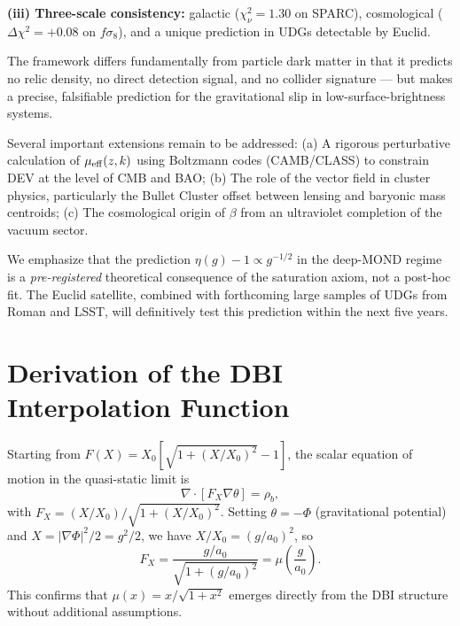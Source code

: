 \documentclass[aps,prd,twocolumn,showpacs,superscriptaddress]{revtex4-2}
\newcommand{\aO}{a_0}
\newcommand{\Xzero}{X_0}
\newcommand{\mueff}{\mu_{\rm eff}}
\begin{document}
\textbf{(iii) Three-scale consistency:}
galactic ($\chi^2_\nu = 1.30$ on SPARC),
cosmological ($\Delta\chi^2 = +0.08$ on $f\sigma_8$),
and a unique prediction in UDGs detectable by Euclid.

The framework differs fundamentally from particle dark matter
in that it predicts no relic density, no direct detection signal,
and no collider signature — but makes a precise, falsifiable
prediction for the gravitational slip in low-surface-brightness systems.

Several important extensions remain to be addressed:
(a) A rigorous perturbative calculation of $\mueff(z,k)$
    using Boltzmann codes (CAMB/CLASS) to constrain DEV at the
    level of CMB and BAO;
(b) The role of the vector field in cluster physics,
    particularly the Bullet Cluster offset between lensing
    and baryonic mass centroids;
(c) The cosmological origin of $\beta$ from an ultraviolet
    completion of the vacuum sector.

We emphasize that the prediction $\eta(g) - 1 \propto g^{-1/2}$
in the deep-MOND regime is a \emph{pre-registered} theoretical
consequence of the saturation axiom, not a post-hoc fit.
The Euclid satellite, combined with forthcoming large samples of
UDGs from Roman and LSST, will definitively test this prediction
within the next five years.

\begin{acknowledgments}
\end{acknowledgments}

\appendix

\section{Derivation of the DBI Interpolation Function}
\label{app:DBI}

Starting from $F(X) = \Xzero[\sqrt{1+(X/\Xzero)^2}-1]$,
the scalar equation of motion in the quasi-static limit is
\begin{equation}
  \nabla\cdot[F_X\nabla\theta] = \rho_b,
\end{equation}
with $F_X = (X/\Xzero)/\sqrt{1+(X/\Xzero)^2}$.
Setting $\theta = -\Phi$ (gravitational potential) and
$X = |\nabla\Phi|^2/2 = g^2/2$, we have $X/\Xzero = (g/\aO)^2$, so
\begin{equation}
  F_X = \frac{g/\aO}{\sqrt{1+(g/\aO)^2}} = \mu\!\left(\frac{g}{\aO}\right).
\end{equation}
This confirms that $\mu(x) = x/\sqrt{1+x^2}$ emerges
directly from the DBI structure without additional assumptions.
\end{document}
